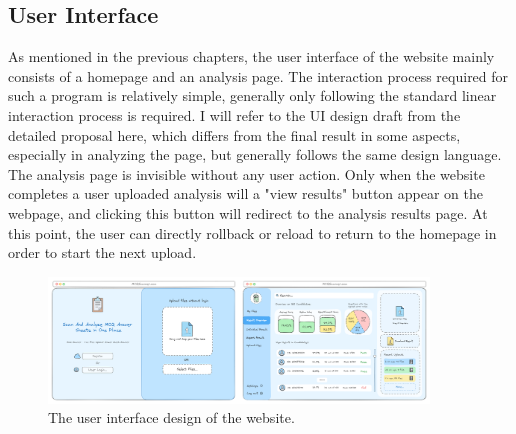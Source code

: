 \documentclass[twocolumn]{article}
\begin{document}
    \subsection{User Interface}
    As mentioned in the previous chapters, the user interface of the website mainly consists of a homepage and an analysis page. The interaction process required for such a program is relatively simple, generally only following the standard linear interaction process is required. I will refer to the UI design draft from the detailed proposal here, which differs from the final result in some aspects, especially in analyzing the page, but generally follows the same design language. The analysis page is invisible without any user action. Only when the website completes a user uploaded analysis will a "view results" button appear on the webpage, and clicking this button will redirect to the analysis results page. At this point, the user can directly rollback or reload to return to the homepage in order to start the next upload.
            
    \begin{figure}
        \centering
        \includegraphics[width=0.9\textwidth]{UI_design.png}
        \caption{The user interface design of the website.}
        \label{fig:UI}
    \end{figure}
    
\end{document}
